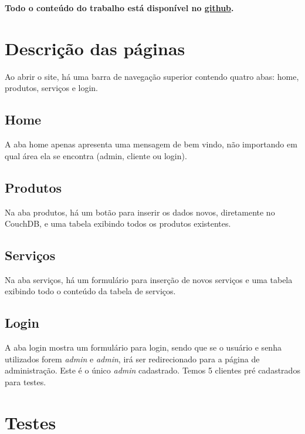 \documentclass[10pt,a4paper]{article}
\begin{document}
\textbf{Todo o conteúdo do trabalho está disponível no \href{https://github.com/Adams123/Web2017}{github}.}

\section{Descrição das páginas}
Ao abrir o site, há uma barra de navegação superior contendo quatro abas: home, produtos, serviços e login.
\subsection{Home}
A aba home apenas apresenta uma mensagem de bem vindo, não importando em qual área ela se encontra (admin, cliente ou login).
\subsection{Produtos}
Na aba produtos, há um botão para inserir os dados novos, diretamente no CouchDB, e uma tabela exibindo todos os produtos existentes.
\subsection{Serviços}
Na aba serviços, há um formulário para inserção de novos serviços e uma tabela exibindo todo o conteúdo da tabela de serviços.
\subsection{Login}
A aba login mostra um formulário para login, sendo que se o usuário e senha utilizados forem \textit{admin} e \textit{admin}, irá ser redirecionado para a página de administração. Este é o único \textit{admin} cadastrado. Temos 5 clientes pré cadastrados para testes.
\section{Testes}
\end{document}
